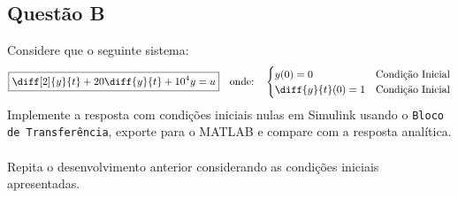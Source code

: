 \documentclass{article}
\begin{document}
        \subsection{Questão B}
            \begin{exercise}
                Considere que o seguinte sistema:
                    \begin{equation}
                        \boxed{
                            \diff[2]{y}{t} + 
                            20\diff{y}{t} + 
                            10^{4} y = u
                        }
                        \quad
                        \text{onde:}
                        \quad
                        \begin{cases}
                            y(0) = 0           & \text{Condição Inicial}\\
                            \diff{y}{t}(0) = 1 & \text{Condição Inicial}\\
                        \end{cases}
                    \end{equation}
                Implemente a resposta com condições iniciais nulas em Simulink usando o \texttt{Bloco de Transferência}, exporte para o MATLAB e compare com a resposta analítica.
                \\\\
                Repita o desenvolvimento anterior considerando as condições iniciais apresentadas.
            \end{exercise}
\end{document}
